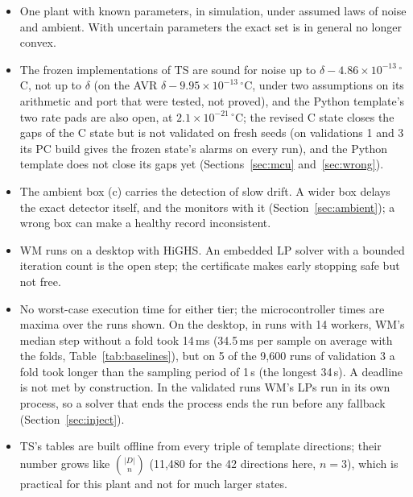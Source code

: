 \documentclass[11pt,a4paper]{article}
\newcommand{\degC}{\ensuremath{{}^\circ}C}
\newcommand{\sci}[2]{\ensuremath{#1\times10^{#2}}}
\begin{document}
\begin{itemize}
\item One plant with known parameters, in simulation, under assumed laws of noise and ambient. With uncertain
  parameters the exact set is in general no longer convex.
\item The frozen implementations of TS are sound for noise up to $\delta - \sci{4.86}{-13}$\,\degC, not up to
  $\delta$ (on the AVR $\delta - \sci{9.95}{-13}$\,\degC, under two assumptions on its arithmetic and port that were
  tested, not proved), and the Python template's two rate pads are also open, at \sci{2.1}{-21}\,\degC; the revised C
  state closes the gaps of the C state but is not validated on fresh seeds (on validations 1 and 3 its PC build gives
  the frozen state's alarms on every run), and the Python template does not close its
  gaps yet (Sections~\ref{sec:mcu} and~\ref{sec:wrong}).
\item The ambient box (c) carries the detection of slow drift. A wider box delays the exact detector itself, and the
  monitors with it (Section~\ref{sec:ambient}); a wrong box can make a healthy record inconsistent.
\item WM runs on a desktop with HiGHS. An embedded LP solver with a bounded iteration count is the open step; the
  certificate makes early stopping safe but not free.
\item No worst-case execution time for either tier; the microcontroller times are maxima over the runs shown. On
  the desktop, in runs with 14 workers, WM's median step without a fold took 14\,ms (34.5\,ms per sample on average with
  the folds, Table~\ref{tab:baselines}), but on 5 of the 9,600 runs of validation 3 a fold
  took longer than the sampling period of 1\,s (the longest 34\,s). A deadline is not met by construction. In the
  validated runs WM's LPs run in its own process, so a solver that ends the process ends the run before any fallback
  (Section~\ref{sec:inject}).
\item TS's tables are built offline from every triple of template directions; their number grows like
  $\binom{|D|}{n}$ (11,480 for the 42 directions here, $n = 3$), which is practical for this plant and not for much
  larger states.

\end{itemize}
\end{document}
